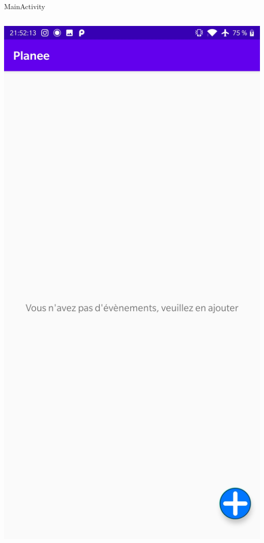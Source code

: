 \documentclass[11pt]{beamer}
\begin{document}
\begin{frame}{MainActivity}
\begin{columns}
\includegraphics[scale=0.1]{ListViewNoEvent}
\end{columns}

\end{frame}
\end{document}
